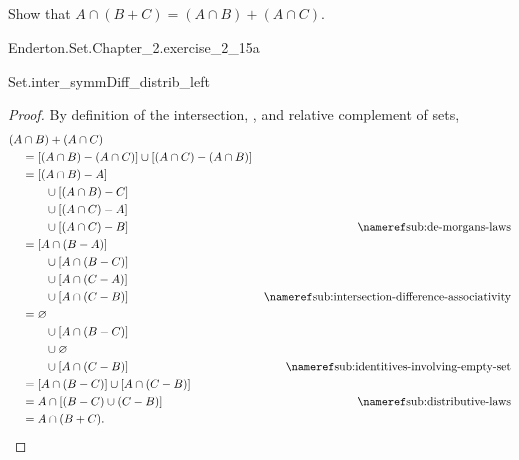 \documentclass{report}
\begin{document}
\subsection{}%

  Show that $A \cap (B + C) = (A \cap B) + (A \cap C)$.

    {Enderton.Set.Chapter\_2.exercise\_2\_15a}

    {Set.inter\_symmDiff\_distrib\_left}

  \begin{proof}
    By definition of the intersection, , and
      relative complement of sets,
      \begin{align*}
        (A & \cap B) + (A \cap C) \\
          & = [(A \cap B) - (A \cap C)] \cup [(A \cap C) - (A \cap B)] \\
          & = [(A \cap B) - A] \\
            & \qquad \cup [(A \cap B) - C] \\
            & \qquad \cup [(A \cap C) - A] \\
            & \qquad \cup [(A \cap C) - B]
            & \textref{sub:de-morgans-laws} \\
          & = [A \cap (B - A)] \\
            & \qquad \cup [A \cap (B - C)] \\
            & \qquad \cup [A \cap (C - A)] \\
            & \qquad \cup [A \cap (C - B)]
            & \textref{sub:intersection-difference-associativity} \\
          & = \emptyset \\
            & \qquad \cup [A \cap (B - C)] \\
            & \qquad \cup \emptyset \\
            & \qquad \cup [A \cap (C - B)]
            & \textref{sub:identitives-involving-empty-set} \\
          & = [A \cap (B - C)] \cup [A \cap (C - B)] \\
          & = A \cap [(B - C) \cup (C - B)]
            & \textref{sub:distributive-laws} \\
          & = A \cap (B + C).
      \end{align*}
  \end{proof}
\end{document}
